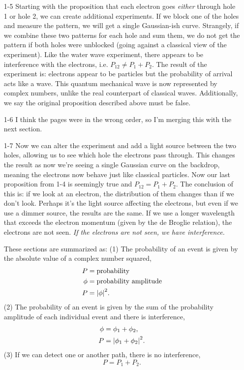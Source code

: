 \documentclass{homework}
\begin{document}
\begin{enumerate}
		\item[1-5] Starting with the proposition that each electron goes \textit{either} through hole 1 or hole 2, we can create additional experiments. If we block one of the holes and measure the pattern, we will get a single Gaussian-ish curve. Strangely, if we combine these two patterns for each hole and sum them, we do not get the pattern if both holes were unblocked (going against a classical view of the experiment). Like the water wave experiment, there appears to be interference with the electrons, i.e. $P_{12} \ne P_1 + P_2$. The result of the experiment is: electrons appear to be particles but the probability of arrival acts like a wave. This quantum mechanical wave is now represented by complex numbers, unlike the real counterpart of classical waves. Additionally, we say the original proposition described above must be false.
		
		\item[1-6] I think the pages were in the wrong order, so I'm merging this with the next section.
		\item[1-7] Now we can alter the experiment and add a light source between the two holes, allowing us to see which hole the electrons pass through. This changes the result as now we're seeing a single Gaussian curve on the backdrop, meaning the electrons now behave just like classical particles. Now our last proposition from 1-4 is seemingly true and $P_{12} = P_1 + P_2$. The conclusion of this is: if we look at an electron, the distribution of them changes than if we don't look. Perhaps it's the light source affecting the electrons, but even if we use a dimmer source, the results are the same. If we use a longer wavelength that exceeds the electron momentum (given by the de Broglie relation), the electrons are not seen. \textit{If the electrons are not seen, we have interference.} 
		
		These sections are summarized as: (1) The probability of an event is given by the absolute value of a complex number squared, \begin{align*}
			P & = \text{probability} \\
			\phi & = \text{probability amplitude} \\
			P & = \abs{\phi}^2.
		\end{align*}
		(2) The probability of an event is given by the sum of the probability amplitude of each individual event and there is interference, \begin{align*}
			\phi & = \phi_1 + \phi_2, \\
			P & = \abs{\phi_1 + \phi_2}^2.
		\end{align*}
		(3) If we can detect one or another path, there is no interference, $$P = P_1 + P_2.$$


\end{enumerate}
\end{document}
